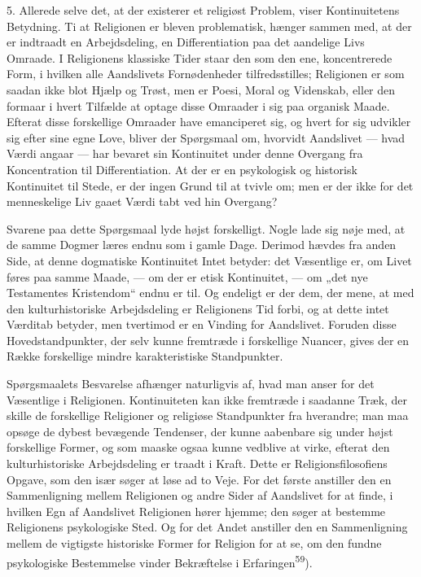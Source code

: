 \documentclass[12pt,a4paper,openany]{book}
\newcommand{\opage}[1]{\marginnote{\footnotesize\textit{[#1]}}}
\begin{document}
5. Allerede selve det, at der existerer et religiøst Problem, viser
Kontinuitetens Betydning. Ti at Religionen er bleven
\opage{79}problematisk, hænger sammen med, at der er indtraadt en
Arbejdsdeling, en Differentiation paa det aandelige Livs Omraade. I Religionens
klassiske Tider staar den som den ene, koncentrerede Form, i hvilken alle
Aandslivets Fornødenheder tilfredsstilles; Religionen er som saadan ikke blot
Hjælp og Trøst, men er Poesi, Moral og Videnskab, eller den formaar i hvert
Tilfælde at optage disse Omraader i sig paa organisk Maade. Efterat disse
forskellige Omraader have emanciperet sig, og hvert for sig udvikler sig efter
sine egne Love, bliver der Spørgsmaal om, hvorvidt Aandslivet --- hvad Værdi
angaar --- har bevaret sin Kontinuitet under denne Overgang fra Koncentration
til Differentiation. At der er en psykologisk og historisk Kontinuitet til
Stede, er der ingen Grund til at tvivle om; men er der ikke for det
menneskelige Liv gaaet Værdi tabt ved hin Overgang?

Svarene paa dette Spørgsmaal lyde højst forskelligt. Nogle lade sig nøje med,
at de samme Dogmer læres endnu som i gamle Dage. Derimod hævdes fra anden Side,
at denne dogmatiske Kontinuitet Intet betyder: det Væsentlige er, om Livet
føres paa samme Maade, --- om der er etisk Kontinuitet, --- om „det nye
Testamentes Kristendom“ endnu er til. Og endeligt er der dem, der mene, at med
den kulturhistoriske Arbejdsdeling er Religionens Tid forbi, og at dette intet
Værditab betyder, men tvertimod er en Vinding for Aandslivet. Foruden disse
Hovedstandpunkter, der selv kunne fremtræde i forskellige Nuancer, gives der en
Række forskellige mindre karakteristiske Standpunkter.

Spørgsmaalets Besvarelse afhænger naturligvis af, hvad man anser for det
Væsentlige i Religionen. Kontinuiteten kan ikke fremtræde i saadanne Træk, der
skille de forskellige Religioner og religiøse Standpunkter fra hverandre; man
maa opsøge de dybest bevægende Tendenser, der kunne aabenbare sig under højst
forskellige Former, og som maaske ogsaa kunne vedblive at virke, efterat den
kulturhistoriske Arbejdsdeling er traadt i Kraft. Dette er Religionsfilosofiens
Opgave, som den især søger at løse ad to Veje. For det første anstiller den en
Sammenligning mellem Religionen og andre Sider af Aandslivet for at
\opage{80}finde, i hvilken Egn af Aandslivet Religionen hører hjemme; den søger
at bestemme Religionens psykologiske Sted. Og for det Andet anstiller den en
Sammenligning mellem de vigtigste historiske Former for Religion for at se, om
den fundne psykologiske Bestemmelse vinder Bekræftelse i
Erfaringen\textsuperscript{59}).
\end{document}

